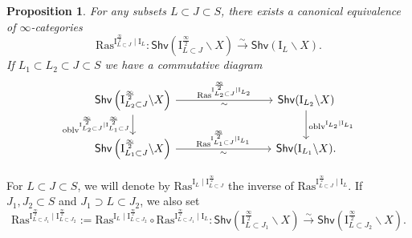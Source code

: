 \documentclass[11pt]{amsart}
\numberwithin{equation}{section}
\theoremstyle{plain}
\newtheorem{prop}[thm]{Proposition}
\theoremstyle{definition}
\newcommand{\I}{{\mathrm I}}
\newcommand{\semi}{{{\frac{\infty}{2}}}}
\newcommand{\quar}{{{\frac{\infty}{4}}}}
\newcommand{\oblv}{\mathrm{oblv}}
\newcommand{\simto}{\xrightarrow{\sim}}
\newcommand{\Shv}{\mathsf{Shv}}
\newcommand{\Ras}{\mathrm{Ras}}
\begin{document}
\begin{prop}
\label{prop:Raskin}
For any subsets $L \subset J \subset S$, there exists a canonical equivalence of $\infty$-categories
\[
\Ras^{\I_{L \subset J}^{\semi} \mid \I_L}: \Shv \left( \I_{L \subset J}^{\semi} \backslash X \right) \simto \Shv \left( \I_L \backslash X \right).
\]
If $L_1 \subset L_2 \subset J \subset S$ we have a commutative diagram
\begin{equation}
\label{eq:comm-diag-ras-oblv}
\begin{tikzcd}[column sep=3cm]
\Shv \left( \I_{L_2 \subset J}^{\semi}\backslash X \right) \ar[r, "\Ras^{\I_{L_2 \subset J}^{\semi} \mid \I_{L_2}}", "\sim"'] \ar[d, "\oblv^{\I_{L_2 \subset J}^{\semi}|\I_{L_1 \subset J}^{\semi}}"'] & \Shv(\I_{L_2} \backslash X) \ar[d, "\oblv^{\I_{L_2}|\I_{L_1}}"] \\
\Shv \left( \I_{L_1 \subset J}^{\semi}\backslash X \right) \ar[r, "\Ras^{\I_{L_1 \subset J}^{\semi} \mid \I_{L_1}}", "\sim"'] & \Shv(\I_{L_1} \backslash X).
\end{tikzcd}
\end{equation}
\end{prop}

For $L \subset J \subset S$,
we will denote by $\Ras^{\I_L \mid \I_{L \subset J}^{\semi}}$ the inverse of $\Ras^{\I_{L \subset J}^{\semi} \mid \I_L}$.
If $J_1, J_2 \subset S$ and $J_1 \supset L \subset J_2$, we also set
\[
\Ras^{\I_{L \subset J_1}^{\semi} \mid \I_{L \subset J_2}^{\semi}} := \Ras^{\I_L \mid \I_{L \subset J_2}^{\semi}} \circ \Ras^{\I_{L \subset J_1}^{\semi} \mid \I_L} : \Shv \left( \I_{L \subset J_1}^{\semi} \backslash X \right) \simto \Shv \left( \I_{L \subset J_2}^\semi \backslash X \right).
\] 
\end{document}
